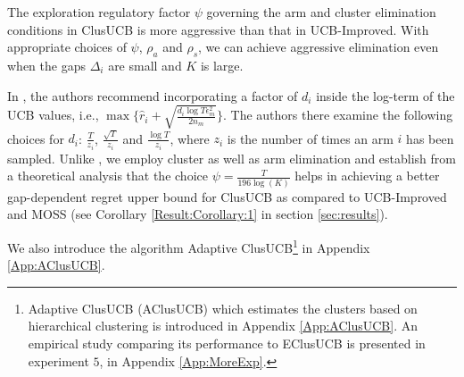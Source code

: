 The exploration regulatory factor $\psi$ governing the arm and cluster elimination conditions in ClusUCB is more aggressive than that in UCB-Improved. With appropriate choices of $\psi$, $\rho_a$ and $\rho_s$, we can achieve aggressive elimination even when the gaps $\Delta_i$ are small and $K$ is large. 


In \citet{liu2016modification}, the authors recommend incorporating a factor of $d_i$ inside the log-term of the UCB values, i.e., $\max \lbrace\hat{r}_{i}+\sqrt{\frac{d_{i}\log T{\epsilon}_{m}^{2}}{2n_{m}}}\rbrace$. 
The authors there examine the following choices for $d_i$: $\frac{T}{z_{i}}$, $\frac{\sqrt{T}}{z_{i}}$ and $\frac{\log T}{z_{i}}$, where $z_{i}$ is the number of times an arm ${i}$ has been sampled.
Unlike \citet{liu2016modification}, we employ cluster as well as arm elimination and establish from a theoretical analysis that the choice $\psi=\frac{T}{196\log (K)}$ helps in achieving a better gap-dependent regret upper bound for ClusUCB as compared to UCB-Improved and MOSS (see Corollary \ref{Result:Corollary:1} in section \ref{sec:results}). 

	We also introduce the algorithm Adaptive ClusUCB\footnote{Adaptive ClusUCB (AClusUCB) which estimates the clusters based on hierarchical clustering is introduced in Appendix \ref{App:AClusUCB}. An empirical study comparing its performance to EClusUCB is presented in experiment $5$, in Appendix \ref{App:MoreExp}.} in Appendix \ref{App:AClusUCB}.





